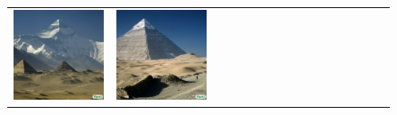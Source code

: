 \begin{figure}
\begin{adjustwidth}{-0.8in}{-0.5in}
\begin{tabular}{cccccccccccccccccccc}
\multicolumn{3}{c}{\includegraphics[width=\twobytwocolwidth\textwidth]{figures/limitations/everent_pyramid_merge1.jpg}} &
\multicolumn{3}{c}{\includegraphics[width=\twobytwocolwidth\textwidth]{figures/limitations/everest_pyramid_merge2.jpg}} &&

\end{tabular}
\end{adjustwidth}
\end{figure}
